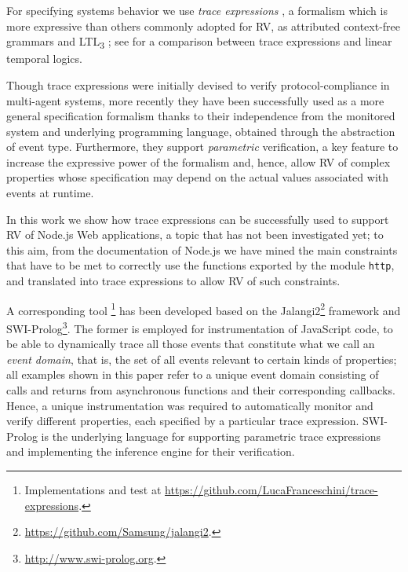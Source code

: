 For specifying systems behavior we use \emph{trace expressions} \cite{ancona2016comparing}, a formalism which is more expressive than others
commonly adopted for RV, as
attributed context-free grammars \cite{de2014combining} and LTL\textsubscript{3} \cite{ltl3}; see \cite{AnconaFM16} for a comparison between trace expressions and linear temporal logics.

Though trace expressions were initially devised to verify protocol-compliance in multi-agent systems, more recently they have been successfully
used as a more general specification formalism \cite{ParametricJava17, TowardsIoT17} thanks to their independence from the monitored system and underlying programming language, obtained through the abstraction of event type.
Furthermore, they support \emph{parametric} verification, a key feature to increase the expressive power of the formalism and, hence, allow RV of complex properties whose specification may depend on the actual values associated with events at runtime.

In this work we show how trace expressions can be successfully used to support RV of Node.js Web applications, a topic that has not
been investigated yet;  to this aim, from the documentation of Node.js we have mined the main constraints that have
to be met to correctly use the functions exported by the module \lstinline{http}, and translated into trace expressions to allow RV of
such constraints.

A corresponding tool%
\footnote{Implementations and test at \url{https://github.com/LucaFranceschini/trace-expressions}.}
has been developed based on the Jalangi2\footnote{\url{https://github.com/Samsung/jalangi2}.}
framework and SWI-Prolog\footnote{\url{http://www.swi-prolog.org}.}.
The former is employed for instrumentation of JavaScript code, to be able
to dynamically trace all those events that constitute what we call an \emph{event domain}, that is, the set
of all events relevant to certain kinds of properties;
all examples shown in this paper refer to a unique event domain consisting of calls and returns
from asynchronous functions and their corresponding callbacks. Hence, a unique instrumentation
was required to automatically monitor and verify different properties, each specified by a particular trace expression.
SWI-Prolog is the underlying language for supporting parametric
trace expressions and implementing the inference engine for their verification.

